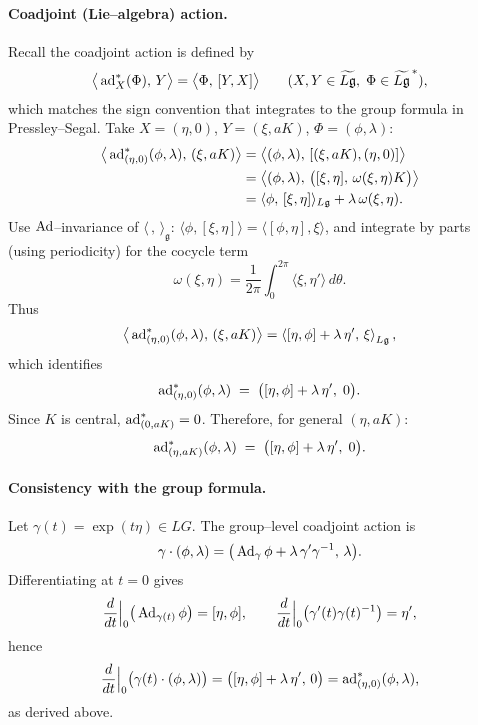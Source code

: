 \documentclass[12pt]{article}
\begin{document}
\begin{remark}
\paragraph{Coadjoint (Lie–algebra) action.}
Recall the coadjoint action is defined by
\[
\big\langle \operatorname{ad}^*_{X}(\Phi),\,Y\big\rangle
= \big\langle \Phi,\,[Y,X]\big\rangle
\qquad (X,Y\in \widetilde{L\mathfrak g},\;\Phi\in \widetilde{L\mathfrak g}^{\,*}),
\]
which matches the sign convention that integrates to the group formula in Pressley--Segal.
Take $X=(\eta,0)$, $Y=(\xi,aK)$, $\Phi=(\phi,\lambda)$:
\begin{align*}
\big\langle \operatorname{ad}^*_{(\eta,0)}(\phi,\lambda),\,(\xi,aK)\big\rangle
&= \big\langle (\phi,\lambda),\,[(\xi,aK),(\eta,0)]\big\rangle\\
&= \big\langle (\phi,\lambda),\,\big([\xi,\eta],\,\omega(\xi,\eta)K\big)\big\rangle\\
&= \langle \phi,\,[\xi,\eta]\rangle_{L\mathfrak g} + \lambda\,\omega(\xi,\eta).
\end{align*}
Use $\operatorname{Ad}$–invariance of $\langle\,,\,\rangle_{\mathfrak g}$:
$\langle \phi,[\xi,\eta]\rangle=\langle [\phi,\eta],\xi\rangle$, and integrate by parts
(using periodicity) for the cocycle term
\[
\omega(\xi,\eta) = \frac{1}{2\pi}\int_0^{2\pi}\!\!\langle \xi,\eta'\rangle\,d\theta.
\]
Thus
\[
\big\langle \operatorname{ad}^*_{(\eta,0)}(\phi,\lambda),\,(\xi,aK)\big\rangle
= \left\langle [\eta,\phi]+\lambda\,\eta',\,\xi\right\rangle_{L\mathfrak g},
\]
which identifies
\[
\operatorname{ad}^*_{(\eta,0)}(\phi,\lambda)\;=\;\big([\eta,\phi]+\lambda\,\eta',\;0\big).
\]
Since $K$ is central, $\operatorname{ad}^*_{(0,aK)}=0$. Therefore, for general $(\eta,aK)$:
\[
\operatorname{ad}^*_{(\eta,aK)}(\phi,\lambda) \;=\; \big([\eta,\phi]+\lambda\,\eta',\;0\big).
\]

\paragraph{Consistency with the group formula.}
Let $\gamma(t)=\exp(t\eta)\in LG$. The group–level coadjoint action is
\[
\gamma\cdot(\phi,\lambda)
= \big(\operatorname{Ad}_\gamma\phi+\lambda\,\gamma'\gamma^{-1},\,\lambda\big).
\]
Differentiating at $t=0$ gives
\[
\frac{d}{dt}\Big|_{0}\big(\operatorname{Ad}_{\gamma(t)}\phi\big)=[\eta,\phi],
\qquad
\frac{d}{dt}\Big|_{0}\big(\gamma'(t)\gamma(t)^{-1}\big)=\eta',
\]
hence
\[
\frac{d}{dt}\Big|_{0}\big(\gamma(t)\cdot(\phi,\lambda)\big)
= \big([\eta,\phi]+\lambda\,\eta',\,0\big)=\operatorname{ad}^*_{(\eta,0)}(\phi,\lambda),
\]
as derived above.
\end{remark}
\end{document}
